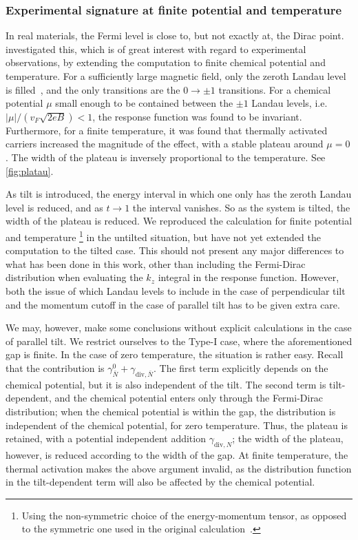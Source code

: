 \subsubsection{Experimental signature at finite potential and temperature}
In real materials, the Fermi level is close to, but not exactly at, the Dirac point.
~\textcite{arjonaFingerprintsConformalAnomaly2019} investigated this, which is of great interest with regard to experimental observations, by extending the computation to finite chemical potential and temperature.
For a sufficiently large magnetic field, only the zeroth Landau level is filled~\cite{arjonaFingerprintsConformalAnomaly2019,vozmedianoTheoreticalPhysicsColloquium2021}, and the only transitions are the \( 0 \to \pm 1 \) transitions.
For a chemical potential \( \mu \) small enough to be contained between the \( \pm 1 \) Landau levels, i.e. \( |\mu| /(v_F \sqrt{2eB} ) < 1 \), the response function was found to be invariant.
Furthermore, for a finite temperature, it was found that thermally activated carriers increased the magnitude of the effect, with a stable plateau around \( \mu = 0 \).
The width of the plateau is inversely proportional to the temperature.
See \cref{fig:platau}.

As tilt is introduced, the energy interval in which one only has the zeroth Landau level is reduced, and as \( t \to 1 \) the interval vanishes.
So as the system is tilted, the width of the plateau is reduced.
We reproduced the calculation for finite potential and temperature%
\footnote{Using the non-symmetric choice of the energy-momentum tensor, as opposed to the symmetric one used in the original calculation~\cite{arjonaFingerprintsConformalAnomaly2019}.}
in the untilted situation, but have not yet extended the computation to the tilted case.
This should not present any major differences to what has been done in this work, other than including the Fermi-Dirac distribution when evaluating the \( k_z \) integral in the response function.
However, both the issue of which Landau levels to include in the case of perpendicular tilt and the momentum cutoff in the case of parallel tilt has to be given extra care.

We may, however, make some conclusions without explicit calculations in the case of parallel tilt.
We restrict ourselves to the Type-I case, where the aforementioned gap is finite.
In the case of zero temperature, the situation is rather easy.
Recall that the contribution is \( \gamma^0_{\bar{N}} + \gamma_{\text{div}, \bar{N}} \).
The first term explicitly depends on the chemical potential, but it is also independent of the tilt.
The second term is tilt-dependent, and the chemical potential enters only through the Fermi-Dirac distribution;
when the chemical potential is within the gap, the distribution is independent of the chemical potential, for zero temperature.
Thus, the plateau is retained, with a potential independent addition \( \gamma_{\text{div},N} \);
the width of the plateau, however, is reduced according to the width of the gap.
At finite temperature, the thermal activation makes the above argument invalid, as the distribution function in the tilt-dependent term will also be affected by the chemical potential.

